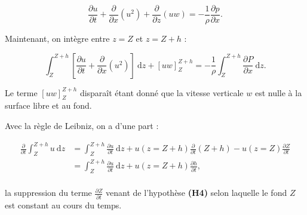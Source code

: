 \documentclass[
11pt, %
francais, %
singlespacing, %
headsepline, %
f%
]{MastersDoctoralThesis} %
\theoremstyle{definition}
\begin{document}



\begin{equation}
\frac{\partial u}{\partial t}+\frac{\partial}{\partial x} (u^{2})+\frac{\partial }{\partial z}(uw)=-\frac{1}{\rho}\frac{\partial p}{\partial x}.
\end{equation}

Maintenant, on intègre entre $z=Z$ et $z=Z+h$ :

\begin{equation}
\int_{Z}^{Z+h}\left[\frac{\partial u}{\partial t}+\frac{\partial }{\partial x}(u^{2})\right]~\mathrm dz+\left[uw\right]_{Z}^{Z+h}=-\frac{1}{\rho}\int_{Z}^{Z+h}\frac{\partial P}{\partial x}~\mathrm dz. \label{EqInt}
\end{equation}

Le terme $\left[uw\right]_{Z}^{Z+h}$ disparaît étant donné que la vitesse verticale $w$ est nulle à la surface libre et au fond.

Avec la règle de Leibniz, on a d'une part :

\begin{equation}
\begin{split}
 \frac{\partial}{\partial t}\int_{Z}^{Z+h}u ~\mathrm dz & = \int_{Z}^{Z+h}\frac{\partial u}{\partial t} ~\mathrm dz +u(z=Z+h)\frac{\partial}{\partial t}(Z+h)-u(z=Z)\frac{\partial Z}{\partial t} \\
& = \int_{Z}^{Z+h}\frac{\partial u}{\partial t} ~\mathrm dz +u(z=Z+h)\frac{\partial h}{\partial t} ,\label{dvpt1}\\
\end{split}
\end{equation}

la suppression du terme $\frac{\partial Z}{\partial t}$ venant de l'hypothèse \textbf{(H4)} selon laquelle le fond $Z$ est constant au cours du temps.
\end{document}
